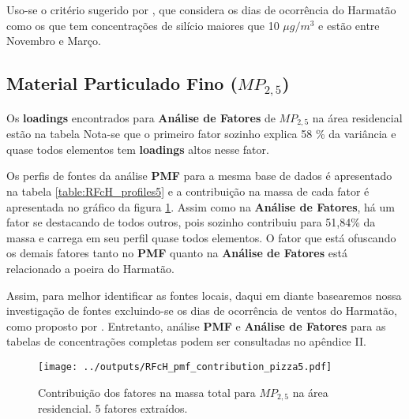 Uso-se o critério sugerido por \citet{aboh2009}, que considera os dias de 
ocorrência do Harmatão como os que tem concentrações de silício maiores que 
10 $\mu g/m^3$ e estão entre Novembro e Março.

\subsection{Material Particulado Fino ($MP_{2,5}$)}

Os \textbf{loadings} encontrados para \textbf{Análise de Fatores} de $MP_{2,5}$
na área residencial estão na tabela %
Nota-se que o primeiro fator sozinho explica 58 \% da variância e quase todos 
elementos tem \textbf{loadings} altos nesse fator. 

\begin{table}[H]
  \centering
  
  \caption{}
\end{table}

Os perfis de fontes da análise \textbf{PMF} para a mesma base de dados é 
apresentado na tabela \ref{table:RFcH_profiles5} e a contribuição na massa
de cada fator é apresentada no gráfico da figura \ref{table:RFcH_contribution5}.
Assim como na \textbf{Análise de Fatores}, há um fator se destacando de todos
outros, pois sozinho contribuiu para 51,84\% da massa e carrega em seu perfil
quase todos elementos. O fator que está ofuscando os demais fatores
tanto no \textbf{PMF} quanto na \textbf{Análise de Fatores} está relacionado
a poeira do Harmatão.
 
Assim, para melhor identificar as fontes locais, daqui em diante basearemos 
nossa investigação de fontes excluindo-se os dias de ocorrência de ventos do 
Harmatão, como proposto por \cite{aboh2009}. Entretanto, análise \textbf{PMF} e 
\textbf{Análise de Fatores} para as tabelas de concentrações completas podem
ser consultadas no apêndice II. 

\begin{landscape}
  \begin{figure}
    \centering
    \begin{minipage}[b]{0.45\linewidth}
      \texttt{[image: ../outputs/RFcH\_pmf\_contribution\_pizza5.pdf]}
      \caption{Contribuição dos fatores na massa total para $MP_{2,5}$ na área
               residencial. 5 fatores extraídos.
               \label{table:RFcH_contribution5}}
    \end{minipage}%
    \hspace{0.5cm}
    \begin{minipage}[b]{0.45\linewidth}
      
    \end{minipage}
  \end{figure}
\end{landscape}


